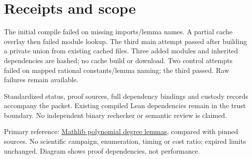 \documentclass[10pt]{article}
\begin{document}
\section*{Receipts and scope}
The initial compile failed on missing imports/lemma names. A partial cache overlay then failed module lookup. The third main attempt passed after building a private union from existing cached files. Three added modules and inherited dependencies are hashed; no cache build or download. Two control attempts failed on mapped rational constants/lemma naming; the third passed. Raw failures remain available.

Standardized status, proof sources, full dependency bindings and custody records accompany the packet. Existing compiled Lean dependencies remain in the trust boundary. No independent binary rechecker or semantic review is claimed.

Primary reference: \href{https://leanprover-community.github.io/mathlib4_docs/Mathlib/Algebra/Polynomial/Degree/Lemmas.html}{Mathlib polynomial degree lemmas}, compared with pinned sources. No scientific campaign, enumeration, timing or cost ratio; expired limits unchanged. Diagram shows proof dependencies, not performance.
\end{document}

